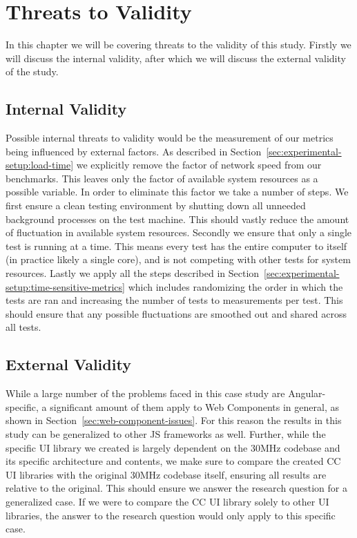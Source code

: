 \chapter{Threats to Validity}\label{chap:threats-to-validity}

In this chapter we will be covering threats to the validity of this study. Firstly we will discuss the internal validity, after which we will discuss the external validity of the study.

\section{Internal Validity}
Possible internal threats to validity would be the measurement of our metrics being influenced by external factors. As described in Section~\ref{sec:experimental-setup:load-time} we explicitly remove the factor of network speed from our benchmarks. This leaves only the factor of available system resources as a possible variable. In order to eliminate this factor we take a number of steps. We first ensure a clean testing environment by shutting down all unneeded background processes on the test machine. This should vastly reduce the amount of fluctuation in available system resources. Secondly we ensure that only a single test is running at a time. This means every test has the entire computer to itself (in practice likely a single core), and is not competing with other tests for system resources. Lastly we apply all the steps described in Section~\ref{sec:experimental-setup:time-sensitive-metrics} which includes randomizing the order in which the tests are ran and increasing the number of tests to \numMeasures{} measurements per test. This should ensure that any possible fluctuations are smoothed out and shared across all tests.

\section{External Validity}
While a large number of the problems faced in this case study are Angular-specific, a significant amount of them apply to Web Components in general, as shown in Section~\ref{sec:web-component-issues}. For this reason the results in this study can be generalized to other JS frameworks as well. Further, while the specific UI library we created is largely dependent on the 30MHz codebase and its specific architecture and contents, we make sure to compare the created CC UI libraries with the original 30MHz codebase itself, ensuring all results are relative to the original. This should ensure we answer the research question for a generalized case. If we were to compare the CC UI library solely to other UI libraries, the answer to the research question would only apply to this specific case.